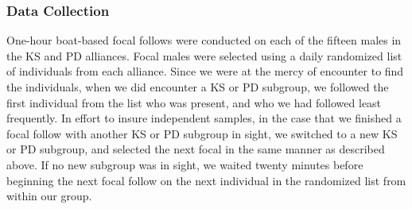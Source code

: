 \documentclass[11pt]{amsart}
\begin{document}
\subsubsection{Data Collection}
One-hour boat-based focal follows were conducted on each of the fifteen males in the KS and PD alliances. Focal males were selected using a daily randomized list of individuals from each alliance. Since we were at the mercy of encounter to find the individuals, when we did encounter a KS or PD subgroup, we followed the first individual from the list who was present, and who we had followed least frequently. In effort to insure independent samples, in the case that we finished a focal follow with another KS or PD subgroup in sight, we switched to a new KS or PD subgroup, and selected the next focal in the same manner as described above. If no new subgroup was in sight, we waited twenty minutes before beginning the next focal follow on the next individual in the randomized list from within our group.
\end{document}
